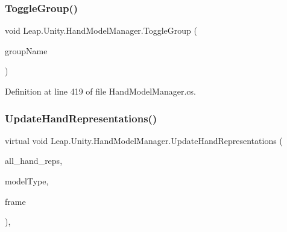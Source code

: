 \subsubsection{\texorpdfstring{ToggleGroup()}{ToggleGroup()}}
{\footnotesize\ttfamily void Leap.\+Unity.\+Hand\+Model\+Manager.\+Toggle\+Group (\begin{DoxyParamCaption}\item[{string}]{group\+Name }\end{DoxyParamCaption})}



Definition at line 419 of file Hand\+Model\+Manager.\+cs.

\mbox{\label{class_leap_1_1_unity_1_1_hand_model_manager_a79e87a3a32fdef95f497a081dae1f533}} 
\subsubsection{\texorpdfstring{UpdateHandRepresentations()}{UpdateHandRepresentations()}}
{\footnotesize\ttfamily virtual void Leap.\+Unity.\+Hand\+Model\+Manager.\+Update\+Hand\+Representations (\begin{DoxyParamCaption}\item[{Dictionary$<$ int, \mbox{\hyperlink{class_leap_1_1_unity_1_1_hand_representation}{Hand\+Representation}} $>$}]{all\+\_\+hand\+\_\+reps,  }\item[{\mbox{\hyperlink{namespace_leap_1_1_unity_a186e5eb0a2b743f1f6b79346f0ab8ad0}{Model\+Type}}}]{model\+Type,  }\item[{\mbox{\hyperlink{class_leap_1_1_frame}{Frame}}}]{frame }\end{DoxyParamCaption})\hspace{0.3cm}{\ttfamily [protected]}, {\ttfamily [virtual]}}

